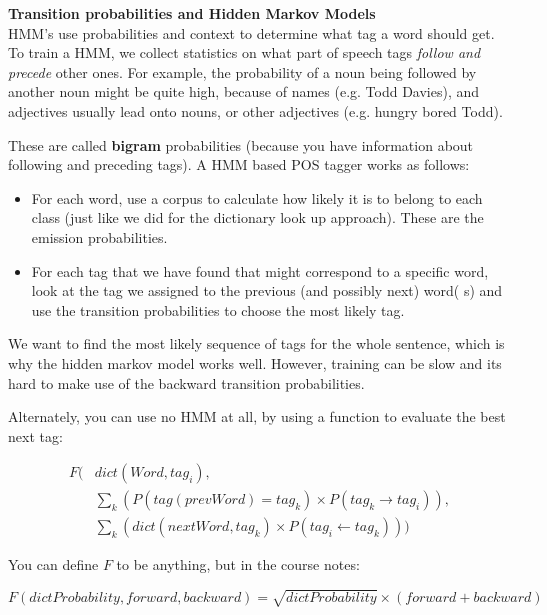 \begin{description}
  \item \textbf{Transition probabilities and Hidden Markov Models}\\
  HMM's use probabilities and context to determine what tag a word should get.
  To train a HMM, we collect statistics on what part of speech tags
  \textit{follow and precede} other ones. For example, the probability of a noun
  being followed by another noun might be quite high, because of names (e.g.
  Todd Davies), and adjectives usually lead onto nouns, or other adjectives
  (e.g. hungry bored Todd).

  These are called \textbf{bigram} probabilities (because you have information
  about following and preceding tags). A HMM based POS tagger works as follows:

  \begin{itemize}
    \item For each word, use a corpus to calculate how likely it is to belong 
    to each class (just like we did for the dictionary look up approach). These 
    are the emission probabilities.
    \item For each tag that we have found that might correspond to a specific 
    word, look at the tag we assigned to the previous (and possibly next) word(
    s) and use the transition probabilities to choose the most likely tag.
  \end{itemize}

  We want to find the most likely sequence of tags for the whole sentence, which
  is why the hidden markov model works well. However, training can be slow and
  its hard to make use of the backward transition probabilities.


  Alternately, you can use no HMM at all, by using a function to evaluate the
  best next tag:

  \[
    \begin{split}
    F(&dict(Word, tag_i),\\
      &\sum_k(P(tag(prevWord) = tag_k) \times P(tag_k \rightarrow tag_i)),\\
      &\sum_k(dict(nextWord, tag_k) \times P(tag_i \leftarrow tag_k)))
    \end{split}
  \]

  You can define $F$ to be anything, but in the course notes:

  \[
    F(dictProbability, forward, backward) = \sqrt{dictProbability} \times 
      (forward + backward)
  \]


\end{description}
